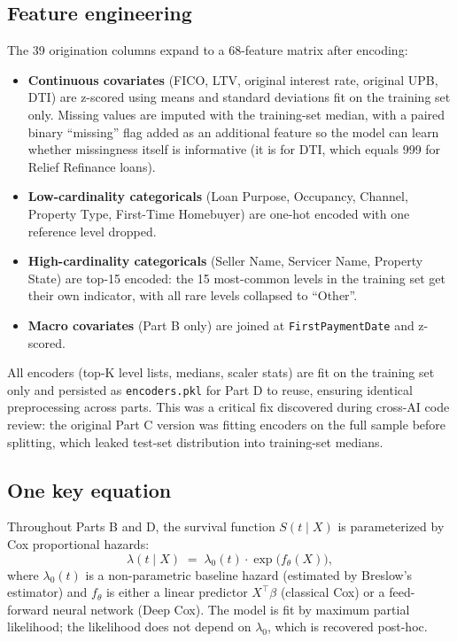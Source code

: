 \documentclass[11pt,a4paper]{article}
\begin{document}
\subsection{Feature engineering}

The 39 origination columns expand to a 68-feature matrix after encoding:

\begin{itemize}[leftmargin=1.2em,itemsep=2pt,topsep=2pt]
  \item \textbf{Continuous covariates} (FICO, LTV, original interest rate, original UPB, DTI) are z-scored using means and standard deviations fit on the training set only. Missing values are imputed with the training-set median, with a paired binary ``missing'' flag added as an additional feature so the model can learn whether missingness itself is informative (it is for DTI, which equals 999 for Relief Refinance loans).
  \item \textbf{Low-cardinality categoricals} (Loan Purpose, Occupancy, Channel, Property Type, First-Time Homebuyer) are one-hot encoded with one reference level dropped.
  \item \textbf{High-cardinality categoricals} (Seller Name, Servicer Name, Property State) are top-15 encoded: the 15 most-common levels in the training set get their own indicator, with all rare levels collapsed to ``Other''.
  \item \textbf{Macro covariates} (Part B only) are joined at \texttt{FirstPaymentDate} and z-scored.
\end{itemize}

All encoders (top-K level lists, medians, scaler stats) are fit on the training set only and persisted as \texttt{encoders.pkl} for Part D to reuse, ensuring identical preprocessing across parts. This was a critical fix discovered during cross-AI code review: the original Part C version was fitting encoders on the full sample before splitting, which leaked test-set distribution into training-set medians.

\subsection{One key equation}

Throughout Parts B and D, the survival function $S(t \mid X)$ is parameterized by Cox proportional hazards:
\begin{equation}
  \lambda(t \mid X) \;=\; \lambda_0(t) \cdot \exp\!\bigl(f_\theta(X)\bigr),
  \label{eq:cox}
\end{equation}
where $\lambda_0(t)$ is a non-parametric baseline hazard (estimated by Breslow's estimator) and $f_\theta$ is either a linear predictor $X^\top \beta$ (classical Cox) or a feed-forward neural network (Deep Cox). The model is fit by maximum partial likelihood; the likelihood does not depend on $\lambda_0$, which is recovered post-hoc.
\end{document}
